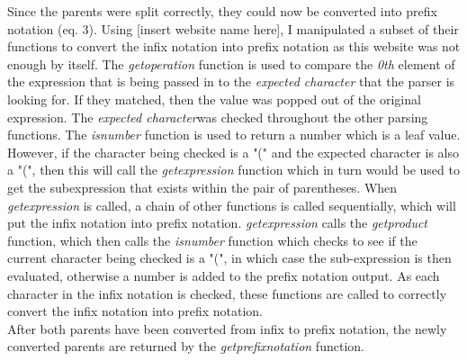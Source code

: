 \documentclass[11pt]{article}
\begin{document}
Since the parents were split correctly, they could now be converted into prefix notation (eq. 3). Using [insert website name here], I manipulated a subset of their functions to convert the infix notation into prefix notation as this website was not enough by itself. The \textit{get\textunderscore operation}  function is used to compare the \textit{0th} element of the expression that is being passed in to the \textit{expected character} that the parser is looking for. If they matched, then the value was popped out of the original expression. The \textit{expected character}was checked throughout the other parsing functions. The \textit{is\textunderscore number} function is used to return a number which is a leaf value. 
However, if the character being checked is a "(" and the expected character is also a "(", then this will call the \textit{get\textunderscore expression} function which in turn would be used to get the subexpression that exists within the pair of parentheses. When  \textit{get\textunderscore expression} is called,  a chain of other functions is called sequentially, which will put the infix notation into prefix notation.
\textit{get\textunderscore expression} calls the \textit{get\textunderscore product} function, which then calls the \textit{is\textunderscore number} function which checks to see if the current character being checked is a "(", in which case the sub-expression is then evaluated, otherwise a number is added to the prefix notation output.  As each character in the infix notation is checked, these functions are called to correctly convert the infix notation into prefix notation. \\ 
After both parents have been converted from infix to prefix notation, the newly converted parents are returned by the \textit{get\textunderscore prefix\textunderscore notation} function.  
\end{document}
